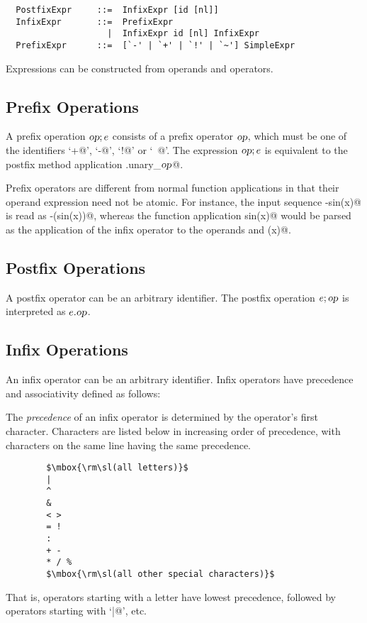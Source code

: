 \syntax\begin{lstlisting}
  PostfixExpr     ::=  InfixExpr [id [nl]]
  InfixExpr       ::=  PrefixExpr
                    |  InfixExpr id [nl] InfixExpr
  PrefixExpr      ::=  [`-' | `+' | `!' | `~'] SimpleExpr 
\end{lstlisting}

Expressions can be constructed from operands and operators. 

\subsection{Prefix Operations}

A prefix operation $\mbox{\sl op};e$ consists of a prefix operator $\mbox{\sl op}$, which
must be one of the identifiers `\lstinline@+@', `\lstinline@-@',
`\lstinline@!@' or `\lstinline@~@'. The expression $\mbox{\sl op};e$ is
equivalent to the postfix method application
\lstinline@e.unary_$\mbox{\sl op}$@.


Prefix operators are different from normal function applications in
that their operand expression need not be atomic. For instance, the
input sequence \lstinline@-sin(x)@ is read as \lstinline@-(sin(x))@, whereas the
function application \lstinline@negate sin(x)@ would be parsed as the
application of the infix operator  to the operands
 and \lstinline@(x)@.

\subsection{Postfix Operations}

A postfix operator can be an arbitrary identifier. The postfix
operation $e;\mbox{\sl op}$ is interpreted as $e.\mbox{\sl op}$. 

\subsection{Infix Operations}

An infix operator can be an arbitrary identifier. Infix operators have
precedence and associativity defined as follows:

The {\em precedence} of an infix operator is determined by the operator's first
character. Characters are listed below in increasing order of
precedence, with characters on the same line having the same precedence.
\begin{lstlisting}
        $\mbox{\rm\sl(all letters)}$
        |
        ^
        &
        < >
        = !
        :
        + -
        * / %
        $\mbox{\rm\sl(all other special characters)}$
\end{lstlisting}
That is, operators starting with a letter have lowest precedence,
followed by operators starting with `\lstinline@|@', etc.

